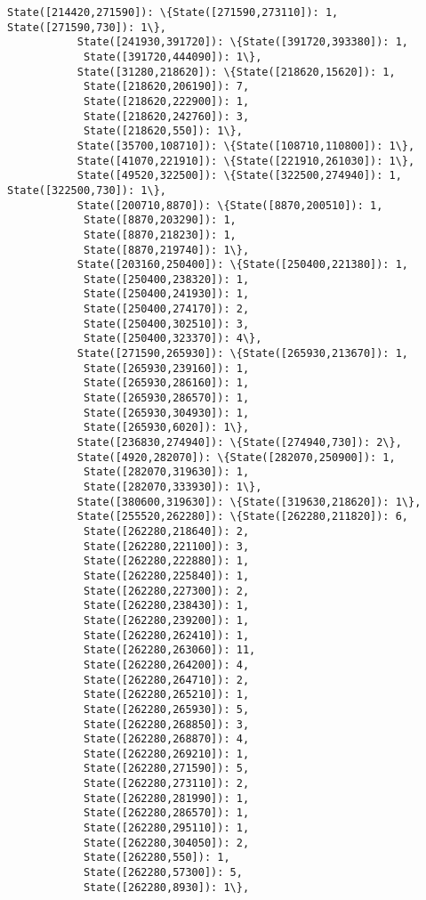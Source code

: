 \documentclass[11pt]{article}
\begin{document}
\begin{Verbatim}[commandchars=\\\{\}]
           State([214420,271590]): \{State([271590,273110]): 1, State([271590,730]): 1\},
           State([241930,391720]): \{State([391720,393380]): 1,
            State([391720,444090]): 1\},
           State([31280,218620]): \{State([218620,15620]): 1,
            State([218620,206190]): 7,
            State([218620,222900]): 1,
            State([218620,242760]): 3,
            State([218620,550]): 1\},
           State([35700,108710]): \{State([108710,110800]): 1\},
           State([41070,221910]): \{State([221910,261030]): 1\},
           State([49520,322500]): \{State([322500,274940]): 1, State([322500,730]): 1\},
           State([200710,8870]): \{State([8870,200510]): 1,
            State([8870,203290]): 1,
            State([8870,218230]): 1,
            State([8870,219740]): 1\},
           State([203160,250400]): \{State([250400,221380]): 1,
            State([250400,238320]): 1,
            State([250400,241930]): 1,
            State([250400,274170]): 2,
            State([250400,302510]): 3,
            State([250400,323370]): 4\},
           State([271590,265930]): \{State([265930,213670]): 1,
            State([265930,239160]): 1,
            State([265930,286160]): 1,
            State([265930,286570]): 1,
            State([265930,304930]): 1,
            State([265930,6020]): 1\},
           State([236830,274940]): \{State([274940,730]): 2\},
           State([4920,282070]): \{State([282070,250900]): 1,
            State([282070,319630]): 1,
            State([282070,333930]): 1\},
           State([380600,319630]): \{State([319630,218620]): 1\},
           State([255520,262280]): \{State([262280,211820]): 6,
            State([262280,218640]): 2,
            State([262280,221100]): 3,
            State([262280,222880]): 1,
            State([262280,225840]): 1,
            State([262280,227300]): 2,
            State([262280,238430]): 1,
            State([262280,239200]): 1,
            State([262280,262410]): 1,
            State([262280,263060]): 11,
            State([262280,264200]): 4,
            State([262280,264710]): 2,
            State([262280,265210]): 1,
            State([262280,265930]): 5,
            State([262280,268850]): 3,
            State([262280,268870]): 4,
            State([262280,269210]): 1,
            State([262280,271590]): 5,
            State([262280,273110]): 2,
            State([262280,281990]): 1,
            State([262280,286570]): 1,
            State([262280,295110]): 1,
            State([262280,304050]): 2,
            State([262280,550]): 1,
            State([262280,57300]): 5,
            State([262280,8930]): 1\},

\end{Verbatim}
\end{document}
